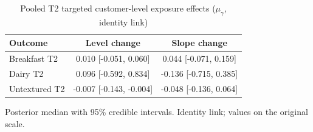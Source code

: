 \begin{table}[H]
\centering
\caption{Pooled T2 targeted customer-level exposure effects ($\mu_\gamma$, identity link)}
\label{tab:a6_t2_mu_gamma}
\begin{tabular}{lcc}
\toprule
Outcome & Level change & Slope change \\
\midrule
Breakfast T2 & 0.010 [-0.051, 0.060] & 0.044 [-0.071, 0.159] \\
Dairy T2 & 0.096 [-0.592, 0.834] & -0.136 [-0.715, 0.385] \\
Untextured T2 & -0.007 [-0.143, -0.004] & -0.048 [-0.136, 0.064] \\
\bottomrule
\end{tabular}
\par\smallskip\footnotesize Posterior median with 95\% credible intervals. Identity link; values on the original scale.
\end{table}
